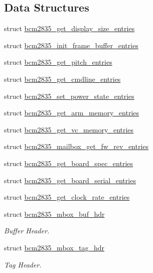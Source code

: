 \subsection*{Data Structures}
\begin{DoxyCompactItemize}
\item 
struct \mbox{\hyperlink{structbcm2835__get__display__size__entries}{bcm2835\+\_\+get\+\_\+display\+\_\+size\+\_\+entries}}
\item 
struct \mbox{\hyperlink{structbcm2835__init__frame__buffer__entries}{bcm2835\+\_\+init\+\_\+frame\+\_\+buffer\+\_\+entries}}
\item 
struct \mbox{\hyperlink{structbcm2835__get__pitch__entries}{bcm2835\+\_\+get\+\_\+pitch\+\_\+entries}}
\item 
struct \mbox{\hyperlink{structbcm2835__get__cmdline__entries}{bcm2835\+\_\+get\+\_\+cmdline\+\_\+entries}}
\item 
struct \mbox{\hyperlink{structbcm2835__set__power__state__entries}{bcm2835\+\_\+set\+\_\+power\+\_\+state\+\_\+entries}}
\item 
struct \mbox{\hyperlink{structbcm2835__get__arm__memory__entries}{bcm2835\+\_\+get\+\_\+arm\+\_\+memory\+\_\+entries}}
\item 
struct \mbox{\hyperlink{structbcm2835__get__vc__memory__entries}{bcm2835\+\_\+get\+\_\+vc\+\_\+memory\+\_\+entries}}
\item 
struct \mbox{\hyperlink{structbcm2835__mailbox__get__fw__rev__entries}{bcm2835\+\_\+mailbox\+\_\+get\+\_\+fw\+\_\+rev\+\_\+entries}}
\item 
struct \mbox{\hyperlink{structbcm2835__get__board__spec__entries}{bcm2835\+\_\+get\+\_\+board\+\_\+spec\+\_\+entries}}
\item 
struct \mbox{\hyperlink{structbcm2835__get__board__serial__entries}{bcm2835\+\_\+get\+\_\+board\+\_\+serial\+\_\+entries}}
\item 
struct \mbox{\hyperlink{structbcm2835__get__clock__rate__entries}{bcm2835\+\_\+get\+\_\+clock\+\_\+rate\+\_\+entries}}
\item 
struct \mbox{\hyperlink{structbcm2835__mbox__buf__hdr}{bcm2835\+\_\+mbox\+\_\+buf\+\_\+hdr}}
\begin{DoxyCompactList}\small\item\em Buffer Header. \end{DoxyCompactList}\item 
struct \mbox{\hyperlink{structbcm2835__mbox__tag__hdr}{bcm2835\+\_\+mbox\+\_\+tag\+\_\+hdr}}
\begin{DoxyCompactList}\small\item\em Tag Header. \end{DoxyCompactList}\item 

\end{DoxyCompactItemize}
